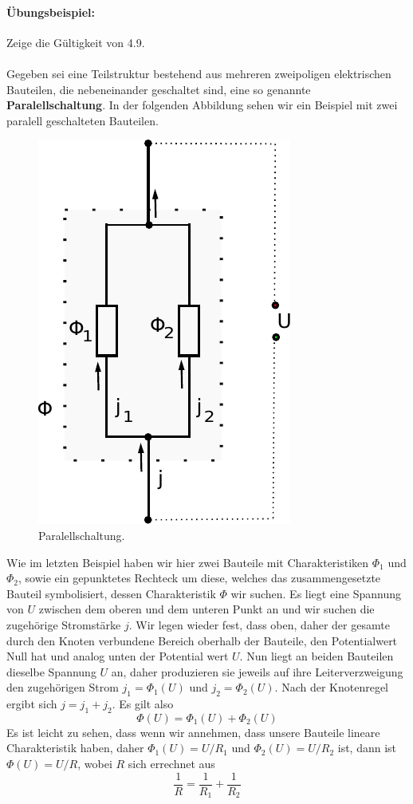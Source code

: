 \documentclass[11pt,a4paper,leqno]{report}
\numberwithin{equation}{chapter}
\begin{document}
\paragraph{\"Ubungsbeispiel:} Zeige die G\"ultigkeit von 4.9.
\\
\\
Gegeben sei eine Teilstruktur bestehend aus mehreren zweipoligen elektrischen Bauteilen, die nebeneinander geschaltet sind, eine so genannte \textbf{Paralellschaltung}. In der folgenden Abbildung sehen wir ein Beispiel mit zwei paralell geschalteten Bauteilen.
\begin{figure}[H]
	\begin{center}
		\includegraphics[scale=0.75]{Bilder/Parallel.pdf}
		\caption{Paralellschaltung.}
	\end{center}
\end{figure}
\noindent
Wie im letzten Beispiel haben wir hier zwei Bauteile mit Charakteristiken $\Phi_1$ und $\Phi_2$, sowie ein gepunktetes Rechteck um diese, welches das zusammengesetzte Bauteil symbolisiert, dessen Charakteristik $\Phi$ wir suchen. Es liegt eine Spannung von $U$ zwischen dem oberen und dem unteren Punkt an und wir suchen die zugeh\"orige Stromst\"arke $j$. Wir legen wieder fest, dass oben, daher der gesamte durch den Knoten verbundene Bereich oberhalb der Bauteile, den Potentialwert Null hat und analog unten der Potential wert $U$. Nun liegt an beiden Bauteilen dieselbe Spannung $U$ an, daher produzieren sie jeweils auf ihre Leiterverzweigung den zugeh\"origen Strom $j_1 = \Phi_1(U)$ und $j_2 = \Phi_2(U)$. Nach der Knotenregel ergibt sich $j = j_1 + j_2$. Es gilt also 
\begin{equation}
	\Phi(U) = \Phi_1(U) + \Phi_2(U)
\end{equation}
Es ist leicht zu sehen, dass wenn wir annehmen, dass unsere Bauteile lineare Charakteristik haben, daher $\Phi_1(U) = U / R_1$ und $\Phi_2(U) = U / R_2$ ist, dann ist $\Phi(U) = U / R$, wobei $R$ sich errechnet aus
\begin{equation*}
	\frac{1}{R} = \frac{1}{R_1} + \frac{1}{R_2}
\end{equation*}
\end{document}
